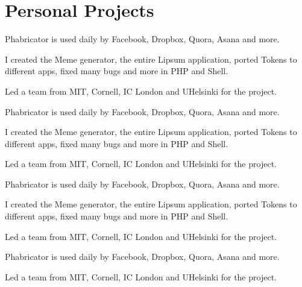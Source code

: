 \documentclass[]{deedy-resume-openfont}
\begin{document}
\begin{minipage}[t]{0.66\textwidth}
\section{Personal Projects}
\begin{tightemize}
\item Phabricator is used daily by Facebook, Dropbox, Quora, Asana and more.
\item I created the Meme generator, the entire Lipsum application, ported Tokens to different apps, fixed many bugs and more in PHP and Shell.
\item Led a team from MIT, Cornell, IC London and UHelsinki for the project.
\end{tightemize}
\sectionsep

\begin{tightemize}
\item Phabricator is used daily by Facebook, Dropbox, Quora, Asana and more.
\item I created the Meme generator, the entire Lipsum application, ported Tokens to different apps, fixed many bugs and more in PHP and Shell.
\item Led a team from MIT, Cornell, IC London and UHelsinki for the project.
\end{tightemize}
\sectionsep

\begin{tightemize}
\item Phabricator is used daily by Facebook, Dropbox, Quora, Asana and more.
\item I created the Meme generator, the entire Lipsum application, ported Tokens to different apps, fixed many bugs and more in PHP and Shell.
\item Led a team from MIT, Cornell, IC London and UHelsinki for the project.
\end{tightemize}
\sectionsep

\begin{tightemize}
\item Phabricator is used daily by Facebook, Dropbox, Quora, Asana and more.
\item Led a team from MIT, Cornell, IC London and UHelsinki for the project.
\end{tightemize}
\sectionsep



\end{minipage}
\end{document}
